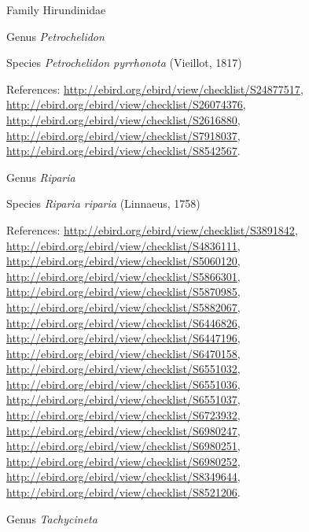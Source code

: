 \documentclass[9pt, article]{memoir}
\begin{document}
\begin{multicols}{2}
\vspace{6pt}\noindent\hspace{24pt}Family Hirundinidae


\vspace{6pt}\noindent\hspace{30pt}Genus \textit{Petrochelidon}


\vspace{6pt}\noindent\hspace{36pt}Species \textit{Petrochelidon pyrrhonota} (Vieillot, 1817)


\vspace{6pt}References: 
\url{http://ebird.org/ebird/view/checklist/S24877517}, 
\url{http://ebird.org/ebird/view/checklist/S26074376}, 
\url{http://ebird.org/ebird/view/checklist/S2616880}, 
\url{http://ebird.org/ebird/view/checklist/S7918037}, 
\url{http://ebird.org/ebird/view/checklist/S8542567}.

\vspace{6pt}\noindent\hspace{30pt}Genus \textit{Riparia}


\vspace{6pt}\noindent\hspace{36pt}Species \textit{Riparia riparia} (Linnaeus, 1758)


\vspace{6pt}References: 
\url{http://ebird.org/ebird/view/checklist/S3891842}, 
\url{http://ebird.org/ebird/view/checklist/S4836111}, 
\url{http://ebird.org/ebird/view/checklist/S5060120}, 
\url{http://ebird.org/ebird/view/checklist/S5866301}, 
\url{http://ebird.org/ebird/view/checklist/S5870985}, 
\url{http://ebird.org/ebird/view/checklist/S5882067}, 
\url{http://ebird.org/ebird/view/checklist/S6446826}, 
\url{http://ebird.org/ebird/view/checklist/S6447196}, 
\url{http://ebird.org/ebird/view/checklist/S6470158}, 
\url{http://ebird.org/ebird/view/checklist/S6551032}, 
\url{http://ebird.org/ebird/view/checklist/S6551036}, 
\url{http://ebird.org/ebird/view/checklist/S6551037}, 
\url{http://ebird.org/ebird/view/checklist/S6723932}, 
\url{http://ebird.org/ebird/view/checklist/S6980247}, 
\url{http://ebird.org/ebird/view/checklist/S6980251}, 
\url{http://ebird.org/ebird/view/checklist/S6980252}, 
\url{http://ebird.org/ebird/view/checklist/S8349644}, 
\url{http://ebird.org/ebird/view/checklist/S8521206}.

\vspace{6pt}\noindent\hspace{30pt}Genus \textit{Tachycineta}



\end{multicols}
\end{document}
